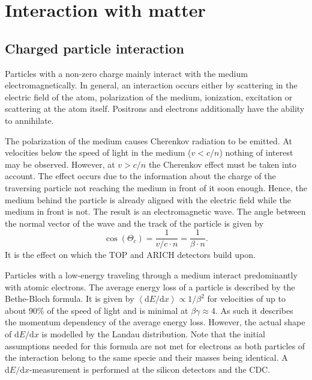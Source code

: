 \section{Interaction with matter}
\label{sec:interaction_with_matter}

\subsection{Charged particle interaction}
\label{subsec:interaction_with_matter}

Particles with a non-zero charge mainly interact with the medium electromagnetically. In general, an interaction occurs either by scattering in the electric field of the atom, polarization of the medium, ionization, excitation or scattering at the atom itself. Positrons and electrons additionally have the ability to annihilate.

The polarization of the medium causes Cherenkov radiation to be emitted. At velocities below the speed of light in the medium ($v < c/n$) nothing of interest may be observed. However, at $v > c/n$ the Cherenkov effect must be taken into account. The effect occurs due to the information about the charge of the traversing particle not reaching the medium in front of it soon enough. Hence, the medium behind the particle is already aligned with the electric field while the medium in front is not. The result is an electromagnetic wave. The angle between the normal vector of the wave and the track of the particle is given by
\begin{equation}
	\cos(\Theta_{c}) = \frac{1}{v/c \cdot n} = \frac{1}{\beta \cdot n}
	\mathrm{.}
\end{equation}
It is the effect on which the TOP and ARICH detectors build upon.

Particles with a low-energy traveling through a medium interact predominantly with atomic electrons. The average energy loss of a particle is described by the Bethe-Bloch formula. It is given by $\left< \mathrm{d}E/\mathrm{d}x \right> \propto 1/{\beta^2}$ for velocities of up to about $90\%$ of the speed of light and is minimal at $\beta \gamma \approx 4$. As such it describes the momentum dependency of the average energy loss. However, the actual shape of $\mathrm{d}E/\mathrm{d}x$ is modelled by the Landau distribution. Note that the initial assumptions needed for this formula are not met for electrons as both particles of the interaction belong to the same specie and their masses being identical.
A $\mathrm{d}E/\mathrm{d}x$-measurement is performed at the silicon detectors and the CDC.

